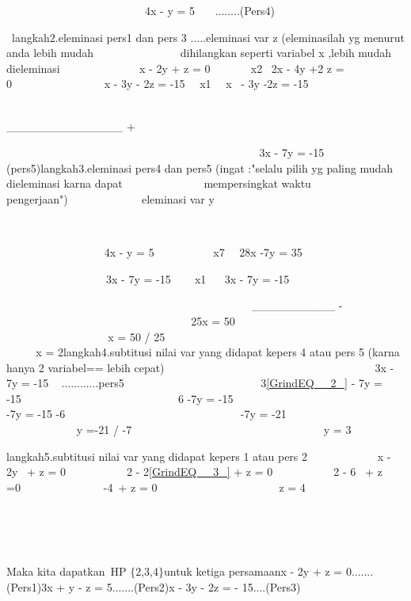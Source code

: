 \documentclass[11pt,fleqn]{book} %
\begin{document}
\noindent ~~~~~~~~~~~~~~~~~~~~~~~~~4x - y = 5~~~ ........(Pers4)

\noindent ~langkah2.eleminasi pers1 dan pers 3 .....eleminasi var z (eleminasilah yg menurut anda lebih mudah~~~~~~~~~~~~~~~ dihilangkan seperti variabel x ,lebih mudah dieleminasi~ ~ ~ ~ ~ ~ ~ ~~ x - 2y + z = 0 ~~~~~~ {\textbar}x2{\textbar}~ 2x - 4y +2 z = 0~~~~~~~~~~~~~~~~ x - 3y - 2z = -15~~ {\textbar}x1{\textbar}~~ x~ - 3y -2z = -15

\noindent ~~~~~~~~~~~~~~~~~~~~~~~~~~~~~~~~~~~~~~~~~~~~~~~~~~~~~ \_\_\_\_\_\_\_\_\_\_\_\_\_\_ + ~ ~ ~

\noindent ~ ~ ~ ~ ~ ~ ~ ~ ~ ~ ~ ~ ~ ~ ~ ~ ~ ~ ~ ~ ~ ~ ~ ~ ~~ ~~~3x - 7y = -15~~~~~~~ (pers5)langkah3.eleminasi pers4 dan pers5 (ingat :"selalu pilih yg paling mudah dieleminasi karna dapat~~~~~~~~~~~~~~ mempersingkat waktu pengerjaan")~~~~~~~~~~ ~~ eleminasi var y

\noindent ~~~~~~~~~~~~~~~

\noindent ~~~~~~~~~~~~~~~~~ 4x - y = 5~~~~~~~~~~ {\textbar}x7{\textbar}~~ 28x -7y = 35

\noindent ~~~~~~~~~~~~~~~~~~3x - 7y = -15 ~~~ {\textbar}x1{\textbar} ~~ 3x - 7y = -15

\noindent ~ ~ ~ ~ ~ ~ ~ ~ ~ ~ ~ ~ ~ ~ ~ ~ ~ ~ ~ ~ ~ ~ ~ ~ ~ ~~ \_\_\_\_\_\_\_\_\_\_ -~ ~ ~ ~ ~ ~ ~ ~ ~ ~ ~ ~ ~ ~ ~ ~ ~ ~ ~ ~ ~ ~ ~ ~ ~ ~ ~ 25x = 50~ ~ ~ ~ ~ ~ ~ ~ ~ ~ ~ ~ ~ ~ ~ ~ ~ ~ ~ ~ ~ ~ ~ ~ ~ ~ ~ ~ ~ x = 50 / 25~ ~ ~ ~ ~ ~ ~ ~ ~ ~ ~ ~ ~ ~ ~ ~ ~ ~ ~ ~ ~ ~ ~ ~ ~ ~ ~ ~ ~~x = 2langkah4.subtitusi nilai var yang didapat kepers 4 atau pers 5 (karna hanya 2 variabel== lebih cepat) ~ ~ ~~~~~~~~~ ~ ~ ~ ~ ~ ~~~~~~~~~~~~~~~~3x - 7y = -15 ~ ............pers5~ ~ ~ ~ ~ ~ ~~~ ~ ~ ~ ~ ~ ~~ 3\eqref{GrindEQ__2_} - 7y = -15~ ~ ~ ~ ~ ~ ~ ~ ~ ~ ~ ~ ~ ~ ~ ~ ~ 6 -7y = -15~ ~ ~ ~ ~ ~ ~ ~ ~ ~ ~ ~ ~ ~ ~ ~ ~ ~ ~ -7y = -15 -6~ ~ ~ ~ ~ ~ ~ ~ ~ ~ ~ ~ ~ ~ ~ ~ ~ ~ ~ -7y = -21~ ~ ~ ~ ~ ~ ~ ~ ~ ~ ~ ~ ~ ~ ~ ~ ~ ~ ~ ~~ y =-21 / -7~ ~ ~ ~ ~ ~ ~ ~ ~ ~ ~ ~ ~ ~ ~ ~ ~ ~ ~ ~~~y = 3~~

\noindent langkah5.subtitusi nilai var yang didapat kepers 1 atau pers 2~~ ~ ~ ~ ~ ~ ~ x - 2y ~+ z = 0~ ~ ~ ~ ~ ~~ 2 - 2\eqref{GrindEQ__3_} + z = 0~ ~ ~ ~ ~ ~~ 2 - 6 ~+ z =0~ ~ ~ ~ ~ ~ ~ ~ ~ -4~+ z = 0~ ~ ~ ~ ~ ~ ~ ~ ~ ~ ~ ~ ~~z = 4~~~~~~~~~~~~~ ~~~~~~~~~~~~~~~~~~~~~~~~~~~~~~~~~~~~

\noindent ~~ ~ ~ ~ ~ ~ ~ ~ ~ ~ ~ ~ ~ ~ ~ ~ ~ ~ ~ ~ ~ ~ ~ ~ ~ ~ ~ ~ ~ ~ ~ ~ ~ ~ ~ ~ ~ ~ ~ ~ ~ ~~ ~ ~ ~~

\noindent Maka kita dapatkan~HP $\{$2,3,4$\}$untuk ketiga persamaanx - 2y + z = 0.......(Pers1)3x + y - z = 5.......(Pers2)x - 3y - 2z = - 15....(Pers3)
\end{document}
